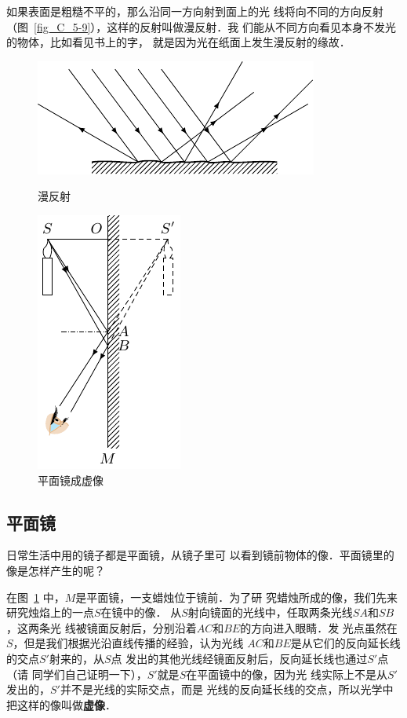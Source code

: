 如果表面是粗糙不平的，那么沿同一方向射到面上的光
线将向不同的方向反射（图~\ref{fig_C_5-9}），这样的反射叫做漫反射．我
们能从不同方向看见本身不发光的物体，比如看见书上的字，
就是因为光在纸面上发生漫反射的缘故．
\begin{figure}[htbp]
    \centering
    \begin{minipage}[t]{0.48\textwidth}
        \centering
        \includegraphics{fig/C/5-9.pdf}
        \caption{漫反射}\label{fig_C_5-9}
    \end{minipage}
    \begin{minipage}[t]{0.48\textwidth}
        \centering
        \includegraphics{fig/C/5-10.pdf}
        \caption{平面镜成虚像}\label{fig_C_5-10}
    \end{minipage}
\end{figure}

    \subsection{平面镜}

    日常生活中用的镜子都是平面镜，从镜子里可
    以看到镜前物体的像．平面镜里的像是怎样产生的呢？

    在图~\ref{fig_C_5-10} 中，$M$是平面镜，一支蜡烛位于镜前．为了研
    究蜡烛所成的像，我们先来研究烛焰上的一点$S$在镜中的像．
    从$S$射向镜面的光线中，任取两条光线$SA$和$SB$，这两条光
    线被镜面反射后，分别沿着$AC$和$BE$的方向进入眼睛．发
    光点虽然在$S$，但是我们根据光沿直线传播的经验，认为光线
    $AC$和$BE$是从它们的反向延长线的交点$S'$射来的，从$S$点
    发出的其他光线经镜面反射后，反向延长线也通过$S'$点（请
    同学们自己证明一下），$S'$就是$S$在平面镜中的像，因为光
    线实际上不是从$S'$发出的，$S'$并不是光线的实际交点，而是
    光线的反向延长线的交点，所以光学中把这样的像叫做\textbf{虚像}．

